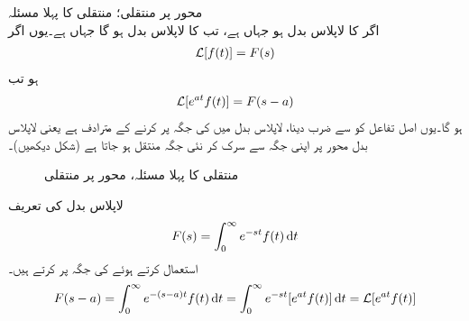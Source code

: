 \quad {} محور پر منتقلی؛ منتقلی کا پہلا مسئلہ\\
اگر  کا لاپلاس بدل  ہو جہاں  ہے، تب  کا لاپلاس بدل  ہو گا جہاں  ہے۔یوں اگر
\begin{align*}
\mathcal{L}[f(t)]=F(s)
\end{align*}
ہو تب 
\begin{align*}
\mathcal{L}[e^{at}f(t)]=F(s-a)
\end{align*}
ہو گا۔یوں اصل تفاعل کو  سے ضرب دینا، لاپلاس بدل میں  کی جگہ  پر کرنے کے مترادف ہے یعنی لاپلاس بدل  محور پر اپنی جگہ سے سرک کر نئی جگہ منتقل ہو جاتا ہے (شکل  دیکھیں)۔ 
\begin{figure}
\centering
{}
\caption{منتقلی کا پہلا مسئلہ،  محور پر منتقلی}
\label{شکل_لاپلاس_تعددی_منتقلی}
\end{figure}
لاپلاس بدل کی تعریف
\begin{align*}
F(s)=\int_{0}^{\infty}e^{-st} f(t)\dif t
\end{align*}
استعمال کرتے ہوئے  کی جگہ  پر کرتے ہیں۔
\begin{align*}
F(s-a)=\int_{0}^{\infty}e^{-(s-a)t} f(t)\dif t=\int_{0}^{\infty}e^{-st} [e^{at}f(t)]\dif t=\Laplace[e^{at}f(t)]
\end{align*}


